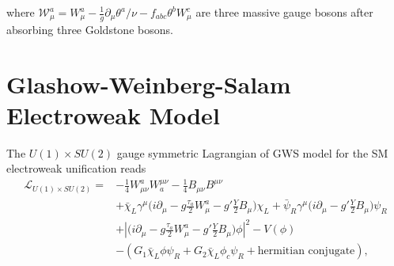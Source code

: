 \noindent where $\mathcal{W}^a_\mu = W^a_\mu - \frac{1}{g} \partial_\mu \theta^a / \nu - f_{abc}\theta^b W^c_\mu$ are three massive gauge bosons after absorbing three Goldstone bosons.



\section{Glashow-Weinberg-Salam Electroweak Model}
\label{sec:physics:qft:gws}
The $U(1) \times SU(2)$ gauge symmetric Lagrangian of GWS model for the SM electroweak unification reads 
\begin{equation}
\begin{split}
    \mathcal{L}_{U(1)\times SU(2)} =&  - \frac{1}{4}W^a_{\mu\nu}W^{\mu\nu}_a - \frac{1}{4}B_{\mu\nu}B^{\mu\nu} \\
    & + \bar{\chi}_L \gamma^\mu \big( i \partial_\mu -g \frac{\tau_a}{2} W^a_\mu -g'\frac{Y}{2} B_\mu \big) \chi_L 
    + \bar{\psi}_R \gamma^\mu \big( i \partial_\mu -g'\frac{Y}{2} B_\mu \big) \psi_R \\
    & + \left\lvert  \big( i \partial_\mu -g \frac{\tau_a}{2} W^a_\mu -g'\frac{Y}{2} B_\mu \big)\phi \right\rvert ^2 - V(\phi) \\
    & -(G_1 \bar{\chi}_L \phi \psi_R + G_2 \bar{\chi}_L \phi_c \psi_R + \text{hermitian conjugate}) ,
\end{split}
\label{eqn:physics:qft:gws:lagragian}
\end{equation}


